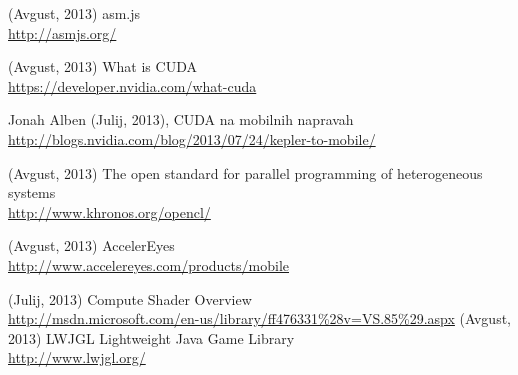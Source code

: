 \begin{thebibliography}{1}
 (Avgust, 2013) asm.js
\\ \url{http://asmjs.org/}

 (Avgust, 2013) What is CUDA
\\ \url{https://developer.nvidia.com/what-cuda}

  Jonah Alben (Julij, 2013), CUDA na mobilnih napravah
\\ \url{http://blogs.nvidia.com/blog/2013/07/24/kepler-to-mobile/}

 (Avgust, 2013) The open standard for parallel programming of heterogeneous systems
\\ \url{http://www.khronos.org/opencl/}

 (Avgust, 2013) AccelerEyes
\\ \url{http://www.accelereyes.com/products/mobile}

 (Julij, 2013) Compute Shader Overview
\\ \url{http://msdn.microsoft.com/en-us/library/ff476331\%28v=VS.85\%29.aspx}
 (Avgust, 2013) LWJGL Lightweight Java Game Library
\\ \url{http://www.lwjgl.org/}

\end{thebibliography}



